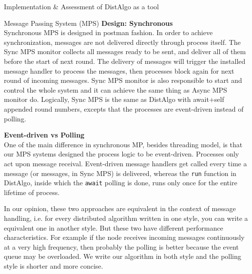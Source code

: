 \documentclass[12pt]{article}  %
\begin{document}
\begin{section}{Implementation \& Assessment of DistAlgo as a tool}
\begin{subsection}{Message Passing System (MPS)}
\noindent
\textbf{Design: Synchronous}\\
Synchronous MPS is designed in postman fashion. In order to achieve synchronization, messages
are not delivered directly through process itself. The Sync MPS monitor collects all messages ready to be sent,
and deliver all of them before the start of next round. The delivery of messages will trigger the installed message handler
to process the messages, then processes block again for next round of incoming messages. Sync MPS monitor is also
responsible to start and control the whole system and it can achieve the same thing as Async MPS monitor do.
Logically, Sync MPS is the same as DistAlgo with await+self appended round numbers, excepts that the processes
are event-driven instead of polling.

\noindent
\textbf{Event-driven vs Polling}\\
One of the main difference in synchronous MP, besides threading model, is that our MPS systems designed the process logic to be
event-driven. Processes only act upon message receival. Event-driven message handlers get called every time a message (or messages,
in Sync MPS) is delivered, whereas the \texttt{run} function in DistAlgo, inside which the \texttt{await} polling is done,
runs only once for the entire lifetime of process.

In our opinion, these two approaches are equivalent in the context of message handling, i.e. for every distributed algorithm
written in one style, you can write a equivalent one in another style. But these two have different performance characteristics.
For example if the node receives incoming messages continuously at a very high frequency, then probably the polling is better
because the event queue may be overloaded. We write our algorithm in both style and the polling style is shorter and
more concise.


\end{subsection}
\end{section}
\end{document}
